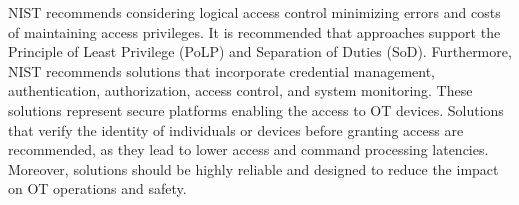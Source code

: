 NIST recommends considering logical access control minimizing errors and costs of maintaining access privileges.
It is recommended that approaches support the Principle of Least Privilege (PoLP) and Separation of Duties (SoD).
Furthermore, NIST recommends solutions that incorporate credential management, authentication, authorization, access control, and system monitoring.
These solutions represent secure platforms enabling the access to OT devices.
Solutions that verify the identity of individuals or devices before granting access are recommended, as they lead to lower access and command processing latencies.
Moreover, solutions should be highly reliable and designed to reduce the impact on OT operations and safety.






